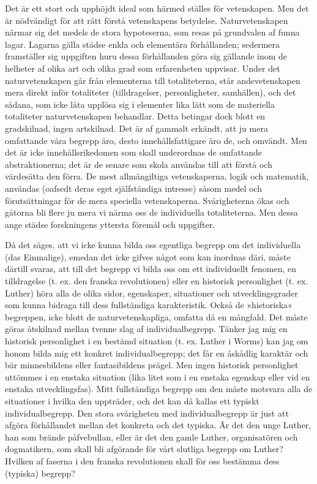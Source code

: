 \documentclass[12pt]{article}
\newcommand{\opage}[1]{\marginnote{\footnotesize\textit{[#1]}}}
\begin{document}
Det är ett stort och upphöjdt ideal som härmed ställes för vetenskapen. Men det är nödvändigt för att rätt förstå vetenskapens betydelse. Naturvetenskapen närmar sig det medels de stora hypoteserna, som resas på grundvalen af funna lagar. Lagarna gälla städse enkla och elementära förhållanden; sedermera framställer sig uppgiften huru dessa förhållanden göra sig gällande inom de helheter af olika art och olika grad som erfarenheten uppvisar. Under det naturvetenskapen går från elementerna till totaliteterna, står andevetenskapen mera direkt inför totaliteter (tilldragelser, personligheter, samhällen), och det sådana, som icke låta upplösa sig i elementer lika lätt som de materiella totaliteter naturvetenskapen behandlar. Detta betingar dock blott en gradskilnad, ingen artskilnad. %
\opage{23}
Det är af gammalt erkändt, att ju mera omfattande våra begrepp äro, desto innehållsfattigare äro de, och omvändt. Men det är icke innehållsrikedomen som skall underordnas de omfattande abstraktionerna; det är de senare som skola användas till att förstå och värdesätta den förra. De mest allmängiltiga vetenskaperna, logik och matematik, användas (oafsedt deras eget själfständiga intresse) såsom medel och förutsättningar för de mera speciella vetenskaperna. Svårigheterna ökas och gåtorna bli flere ju mera vi närma oss de individuella totaliteterna. Men dessa ange städse forskningens yttersta föremål och uppgifter.

Då det säges, att vi icke kunna bilda oss egentliga begrepp om det individuella (das Einmalige), emedan det icke gifves något som kan inordnas däri, måste därtill svaras, att till det begrepp vi bilda oss om ett individuellt fenomen, en tilldragelse (t. ex. den franska revolutionen) eller en historisk personlighet (t. ex. Luther) höra alla de olika sidor, egenskaper, situationer och utvecklingsgrader som kunna bidraga till dess fullständiga karakteristik. Också de »historiska» begreppen, icke blott de naturvetenskapliga, %
\opage{24}
omfatta då en mångfald. Det måste göras åtskilnad mellan tvenne slag af individualbegrepp. Tänker jag mig en historisk personlighet i en bestämd situation (t. ex. Luther i Worms) kan jag om honom bilda mig ett konkret individualbegrepp; det får en åskådlig karaktär och bär minnesbildens eller fantasibildens prägel. Men ingen historisk personlighet uttömmes i en enstaka situation (lika litet som i en enstaka egenskap eller vid en enstaka utvecklingsfas). Mitt fullständiga begrepp om den måste motsvara alla de situationer i hvilka den uppträder, och det kan då kallas ett typiskt individualbegrepp. Den stora svårigheten med individualbegrepp är just att afgöra förhållandet mellan det konkreta och det typiska. Är det den unge Luther, han som brände påfvebullan, eller är det den gamle Luther, organisatören och dogmatikern, som skall bli afgörande för vårt slutliga begrepp om Luther? Hvilken af faserna i den franska revolutionen skall för oss bestämma dess (typiska) begrepp?
\end{document}
